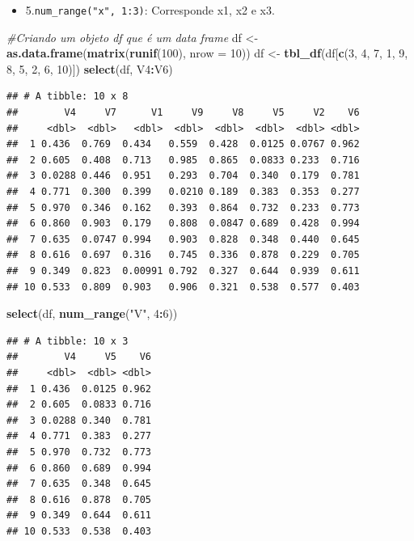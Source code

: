 \documentclass[]{book}
\newenvironment{Shaded}{\begin{snugshade}}{\end{snugshade}}
\newcommand{\CommentTok}[1]{\textcolor[rgb]{0.56,0.35,0.01}{\textit{#1}}}
\newcommand{\DataTypeTok}[1]{\textcolor[rgb]{0.13,0.29,0.53}{#1}}
\newcommand{\DecValTok}[1]{\textcolor[rgb]{0.00,0.00,0.81}{#1}}
\newcommand{\KeywordTok}[1]{\textcolor[rgb]{0.13,0.29,0.53}{\textbf{#1}}}
\newcommand{\NormalTok}[1]{#1}
\newcommand{\OperatorTok}[1]{\textcolor[rgb]{0.81,0.36,0.00}{\textbf{#1}}}
\newcommand{\StringTok}[1]{\textcolor[rgb]{0.31,0.60,0.02}{#1}}
\providecommand{\tightlist}{%
  \setlength{\itemsep}{0pt}\setlength{\parskip}{0pt}}
\begin{document}
\begin{itemize}
\tightlist
\item
  5.\texttt{num\_range("x",\ 1:3)}: Corresponde x1, x2 e x3.
\end{itemize}

\begin{Shaded}
\begin{Highlighting}[]
\CommentTok{#Criando um objeto df que é um data frame}
\NormalTok{df <-}\StringTok{ }\KeywordTok{as.data.frame}\NormalTok{(}\KeywordTok{matrix}\NormalTok{(}\KeywordTok{runif}\NormalTok{(}\DecValTok{100}\NormalTok{), }\DataTypeTok{nrow =} \DecValTok{10}\NormalTok{)) }
\NormalTok{df <-}\StringTok{ }\KeywordTok{tbl_df}\NormalTok{(df[}\KeywordTok{c}\NormalTok{(}\DecValTok{3}\NormalTok{, }\DecValTok{4}\NormalTok{, }\DecValTok{7}\NormalTok{, }\DecValTok{1}\NormalTok{, }\DecValTok{9}\NormalTok{, }\DecValTok{8}\NormalTok{, }\DecValTok{5}\NormalTok{, }\DecValTok{2}\NormalTok{, }\DecValTok{6}\NormalTok{, }\DecValTok{10}\NormalTok{)])}
\KeywordTok{select}\NormalTok{(df, V4}\OperatorTok{:}\NormalTok{V6)}
\end{Highlighting}
\end{Shaded}

\begin{verbatim}
## # A tibble: 10 x 8
##        V4     V7      V1     V9     V8     V5     V2    V6
##     <dbl>  <dbl>   <dbl>  <dbl>  <dbl>  <dbl>  <dbl> <dbl>
##  1 0.436  0.769  0.434   0.559  0.428  0.0125 0.0767 0.962
##  2 0.605  0.408  0.713   0.985  0.865  0.0833 0.233  0.716
##  3 0.0288 0.446  0.951   0.293  0.704  0.340  0.179  0.781
##  4 0.771  0.300  0.399   0.0210 0.189  0.383  0.353  0.277
##  5 0.970  0.346  0.162   0.393  0.864  0.732  0.233  0.773
##  6 0.860  0.903  0.179   0.808  0.0847 0.689  0.428  0.994
##  7 0.635  0.0747 0.994   0.903  0.828  0.348  0.440  0.645
##  8 0.616  0.697  0.316   0.745  0.336  0.878  0.229  0.705
##  9 0.349  0.823  0.00991 0.792  0.327  0.644  0.939  0.611
## 10 0.533  0.809  0.903   0.906  0.321  0.538  0.577  0.403
\end{verbatim}

\begin{Shaded}
\begin{Highlighting}[]
\KeywordTok{select}\NormalTok{(df, }\KeywordTok{num_range}\NormalTok{(}\StringTok{"V"}\NormalTok{, }\DecValTok{4}\OperatorTok{:}\DecValTok{6}\NormalTok{))}
\end{Highlighting}
\end{Shaded}

\begin{verbatim}
## # A tibble: 10 x 3
##        V4     V5    V6
##     <dbl>  <dbl> <dbl>
##  1 0.436  0.0125 0.962
##  2 0.605  0.0833 0.716
##  3 0.0288 0.340  0.781
##  4 0.771  0.383  0.277
##  5 0.970  0.732  0.773
##  6 0.860  0.689  0.994
##  7 0.635  0.348  0.645
##  8 0.616  0.878  0.705
##  9 0.349  0.644  0.611
## 10 0.533  0.538  0.403
\end{verbatim}
\end{document}
